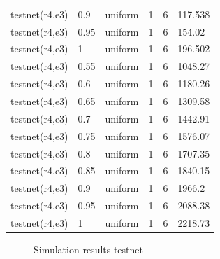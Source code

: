 \begin{longtable}[H]{llllll}
testnet(r4,e3) & 0.9  & uniform & 1 & 6       & 117.538 \\
testnet(r4,e3) & 0.95 & uniform & 1 & 6       & 154.02  \\
testnet(r4,e3) & 1    & uniform & 1 & 6       & 196.502 \\
testnet(r4,e3) & 0.55 & uniform & 1 & 6       & 1048.27 \\
testnet(r4,e3) & 0.6  & uniform & 1 & 6       & 1180.26 \\
testnet(r4,e3) & 0.65 & uniform & 1 & 6       & 1309.58 \\
testnet(r4,e3) & 0.7  & uniform & 1 & 6       & 1442.91 \\
testnet(r4,e3) & 0.75 & uniform & 1 & 6       & 1576.07 \\
testnet(r4,e3) & 0.8  & uniform & 1 & 6       & 1707.35 \\
testnet(r4,e3) & 0.85 & uniform & 1 & 6       & 1840.15 \\
testnet(r4,e3) & 0.9  & uniform & 1 & 6       & 1966.2  \\
testnet(r4,e3) & 0.95 & uniform & 1 & 6       & 2088.38 \\
testnet(r4,e3) & 1    & uniform & 1 & 6       & 2218.73 \\
\end{longtable}

\begin{figure}[H]
    \centering
    \caption{Simulation results testnet}
    \label{fig:testnet_2}
\end{figure}

